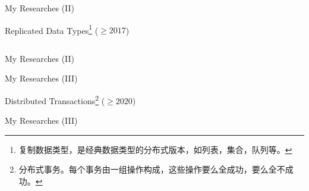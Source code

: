 \begin{frame}{My Researches (II)}
	\begin{center}
		Replicated Data Types\footnote{复制数据类型，是经典数据类型的分布式版本，如列表，集合，队列等。} ($\ge 2017$) \\[6pt]

		\begin{columns}[c]
		\end{columns}
	\end{center}
\end{frame}

\begin{frame}{My Researches (II)}

	\vspace{0.30cm}

	\vspace{0.30cm}

	\vspace{0.30cm}
\end{frame}

\begin{frame}{My Researches (III)}
	\begin{center}
		Distributed Transactions\footnote{
			分布式事务。每个事务由一组操作构成，这些操作要么全成功，要么全不成功。} ($\ge 2020$)

	\end{center}
\end{frame}

\begin{frame}{My Researches (III)}
\end{frame}
